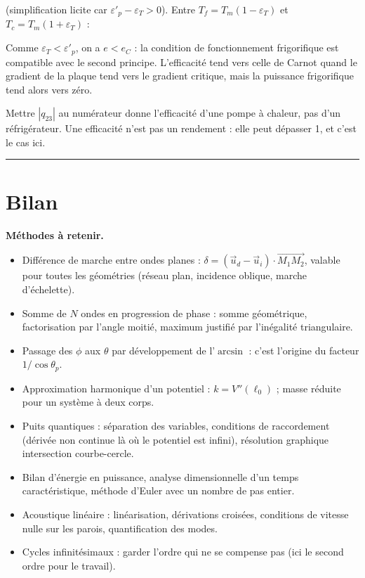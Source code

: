 \documentclass[11pt,a4paper]{article}
\providecommand{\tightlist}{\setlength{\itemsep}{0pt}\setlength{\parskip}{0pt}}
\newcommand{\equationajustee}[1]{%
  \sbox{\boiteequation}{$\displaystyle #1$}%
  \ifdim\wd\boiteequation>\linewidth
    \[\resizebox{\linewidth}{!}{\usebox{\boiteequation}}\]%
  \else
    \[#1\]%
  \fi}
\begin{document}
(simplification licite car \(\varepsilon'_p-\varepsilon_T>0\)). Entre \(T_f = T_m(1-\varepsilon_T)\) et \(T_c = T_m(1+\varepsilon_T)\) :

\equationajustee{\begin{aligned}
e_C &= \frac{T_f}{T_c-T_f}\\
&= \boxed{\frac{1-\varepsilon_T}{2\varepsilon_T}\simeq\frac{1}{2\varepsilon_T}}
\end{aligned}}

Comme \(\varepsilon_T<\varepsilon'_p\), on a \(e<e_C\) : la condition de fonctionnement frigorifique est compatible avec le second principe. L'efficacité tend vers celle de Carnot quand le gradient de la plaque tend vers le gradient critique, mais la puissance frigorifique tend alors vers zéro.

\begin{piege}

Mettre \(|q_{23}|\) au numérateur donne l'efficacité d'une pompe à chaleur, pas d'un réfrigérateur. Une efficacité n'est pas un rendement : elle peut dépasser 1, et c'est le cas ici.

\end{piege}

\begin{center}\rule{0.5\linewidth}{0.5pt}\end{center}

\hypertarget{bilan}{%
\section{Bilan}\label{bilan}}

\textbf{Méthodes à retenir.}

\begin{itemize}
\tightlist
\item
  Différence de marche entre ondes planes : \(\delta = (\vec u_d-\vec u_i)\cdot\overrightarrow{M_1M_2}\), valable pour toutes les géométries (réseau plan, incidence oblique, marche d'échelette).
\item
  Somme de \(N\) ondes en progression de phase : somme géométrique, factorisation par l'angle moitié, maximum justifié par l'inégalité triangulaire.
\item
  Passage des \(\phi\) aux \(\theta\) par développement de l'\(\arcsin\) : c'est l'origine du facteur \(1/\cos\theta_p\).
\item
  Approximation harmonique d'un potentiel : \(k = V''(\ell_0)\) ; masse réduite pour un système à deux corps.
\item
  Puits quantiques : séparation des variables, conditions de raccordement (dérivée non continue là où le potentiel est infini), résolution graphique intersection courbe-cercle.
\item
  Bilan d'énergie en puissance, analyse dimensionnelle d'un temps caractéristique, méthode d'Euler avec un nombre de pas entier.
\item
  Acoustique linéaire : linéarisation, dérivations croisées, conditions de vitesse nulle sur les parois, quantification des modes.
\item
  Cycles infinitésimaux : garder l'ordre qui ne se compense pas (ici le second ordre pour le travail).
\end{itemize}
\end{document}
